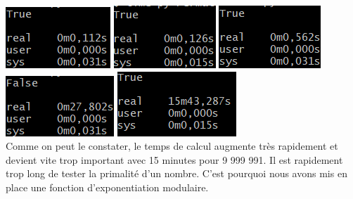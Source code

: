 \includegraphics[scale=1]{images/fermat1.png}
\includegraphics[scale=1]{images/fermat2.png}
\includegraphics[scale=1]{images/fermat3.png}
\includegraphics[scale=1]{images/fermat4.png}
\includegraphics[scale=1]{images/fermat5.png}
\\
Comme on peut le constater, le temps de calcul augmente très rapidement et devient vite trop important avec 15 minutes pour 9 999 991. Il est rapidement trop long de tester la primalité d'un nombre. C'est pourquoi nous avons mis en place une fonction d'exponentiation modulaire.